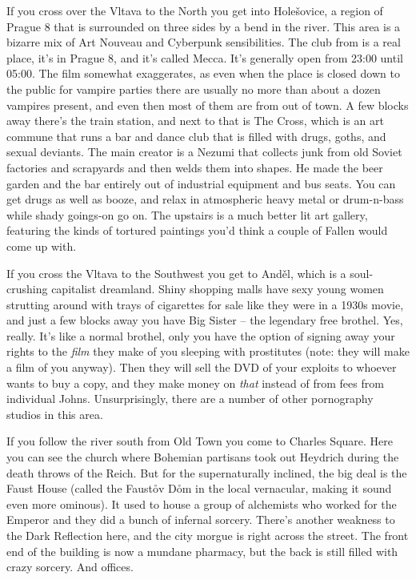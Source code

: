 If you cross over the Vltava to the North you get into Hole\v{s}ovice, a region of Prague 8 that is surrounded on three sides by a bend in the river. This area is a bizarre mix of Art Nouveau and Cyberpunk sensibilities. The club from  is a real place, it's in Prague 8, and it's called Mecca. It's generally open from 23:00 until 05:00. The film somewhat exaggerates, as even when the place is closed down to the public for vampire parties there are usually no more than about a dozen vampires present, and even then most of them are from out of town. A few blocks away there's the train station, and next to that is The Cross, which is an art commune that runs a bar and dance club that is filled with drugs, goths, and sexual deviants. The main creator is a Nezumi that collects junk from old Soviet factories and scrapyards and then welds them into shapes. He made the beer garden and the bar entirely out of industrial equipment and bus seats. You can get drugs as well as booze, and relax in atmospheric heavy metal or drum-n-bass while shady goings-on go on. The upstairs is a much better lit art gallery, featuring the kinds of tortured paintings you'd think a couple of Fallen would come up with.

If you cross the Vltava to the Southwest you get to And\v{e}l, which is a soul-crushing capitalist dreamland. Shiny shopping malls have sexy young women strutting around with trays of cigarettes for sale like they were in a 1930s movie, and just a few blocks away you have Big Sister -- the legendary free brothel. Yes, really. It's like a normal brothel, only you have the option of signing away your rights to the \textit{film} they make of you sleeping with prostitutes (note: they will make a film of you anyway). Then they will sell the DVD of your exploits to whoever wants to buy a copy, and they make money on \textit{that} instead of from fees from individual Johns. Unsurprisingly, there are a number of other pornography studios in this area.

If you follow the river south from Old Town you come to Charles Square. Here you can see the church where Bohemian partisans took out Heydrich during the death throws of the Reich. But for the supernaturally inclined, the big deal is the Faust House (called the Faust\r{o}v D\r{o}m in the local vernacular, making it sound even more ominous). It used to house a group of alchemists who worked for the Emperor and they did a bunch of infernal sorcery. There's another weakness to the Dark Reflection here, and the city morgue is right across the street. The front end of the building is now a mundane pharmacy, but the back is still filled with crazy sorcery. And offices.

